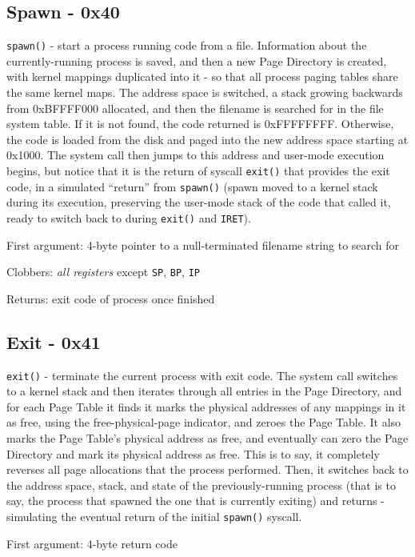 \documentclass[12pt,a4paper]{report}
\begin{document}
\subsection*{Spawn - 0x40}
\texttt{spawn()} - start a process running code from a file. Information about the currently-running process is saved, and then a new Page Directory is created, with kernel mappings duplicated into it - so that all process paging tables share the same kernel maps. The address space is switched, a stack growing backwards from 0xBFFFF000 allocated, and then the filename is searched for in the file system table. If it is not found, the code returned is 0xFFFFFFFF. Otherwise, the code is loaded from the disk and paged into the new address space starting at 0x1000. The system call then jumps to this address and user-mode execution begins, but notice that it is the return of syscall \texttt{exit()} that provides the exit code, in a simulated ``return'' from \texttt{spawn()} (spawn moved to a kernel stack during its execution, preserving the user-mode stack of the code that called it, ready to switch back to during \texttt{exit()} and \texttt{IRET}).

First argument: 4-byte pointer to a null-terminated filename string to search for

Clobbers: \emph{all registers} except \texttt{SP}, \texttt{BP}, \texttt{IP}

Returns: exit code of process once finished

\subsection*{Exit - 0x41}
\texttt{exit()} - terminate the current process with exit code. The system call switches to a kernel stack and then iterates through all entries in the Page Directory, and for each Page Table it finds it marks the physical addresses of any mappings in it as free, using the free-physical-page indicator, and zeroes the Page Table. It also marks the Page Table's physical address as free, and eventually can zero the Page Directory and mark its physical address as free. This is to say, it completely reverses all page allocations that the process performed. Then, it switches back to the address space, stack, and state of the previously-running process (that is to say, the process that spawned the one that is currently exiting) and returns - simulating the eventual return of the initial \texttt{spawn()} syscall.

First argument: 4-byte return code
\end{document}

